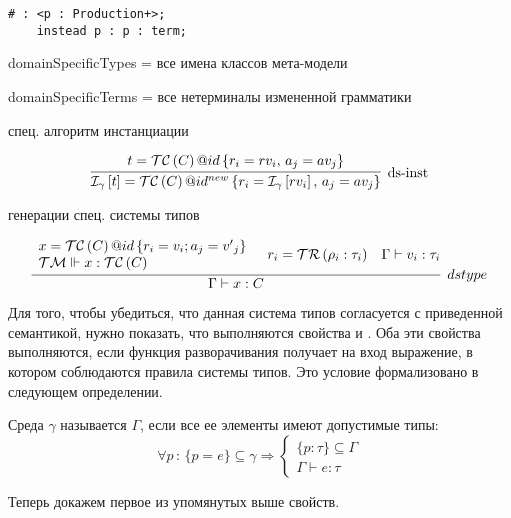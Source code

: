 \begin{lstlisting}
# : <p : Production+>;
	instead p : p : term;
\end{lstlisting}

domainSpecificTypes = все имена классов мета-модели

domainSpecificTerms = все нетерминалы измененной грамматики

спец. алгоритм инстанциации

$$
\trule{
	t = \obj{\TC{C}}{id}{r_i = rv_i,\, a_j = av_j}
}{
	\Inst{\gamma}{t} = \obj{\TC{C}}{id^{new}}{r_i = \Inst{\gamma}{rv_i}, \,a_j = av_j }
}{ds-inst}
$$ 

генерации спец. системы типов

$$
\infer[dstype]{
	\Gamma \vdash x : C
}{
	\begin{array}{l}
	x = \obj{\TC{C}}{id}{r_i = v_i; a_j = {v'}_j}\\
	\TM \Vdash x : \TC{C} 
	\end{array}	
	&
	r_i = \TR{\rho_i : \tau_i} &
	\Gamma \vdash v_i : \tau_i
}
$$ 

Для того, чтобы убедиться, что данная система типов согласуется с приведенной семантикой, нужно показать, что выполняются свойства  и  \cite{???}. Оба эти свойства выполняются, если функция разворачивания получает на вход выражение, в котором соблюдаются правила системы типов. Это условие формализовано в следующем определении.

\begin{Def}\label{agree}
Среда $\gamma$ называется  $\Gamma$, если все ее элементы имеют допустимые типы:
$$
	\forall p \, : \, 
		\{p = e\} \subseteq \gamma 
			\Rightarrow 
		\left\{\begin{array}{l}		
		\{p : \tau\} \subseteq \Gamma \\
		\Gamma \vdash e : \tau
		\end{array}\right.
$$
\end{Def}

Теперь докажем первое из упомянутых выше свойств.

